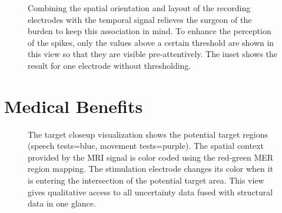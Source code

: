 \documentclass{egpubl}
\begin{document}
\begin{figure}[t]
    \centering
    \caption{Combining the spatial orientation and layout of the recording electrodes with the temporal signal relieves the surgeon of the burden to keep this association in mind. To enhance the perception of the spikes, only the values above a certain threshold are shown in this view so that they are visible pre-attentively. The inset shows the result for one electrode without thresholding.}
    \label{fig:recordingphase:3dsound}
\end{figure}


\section{Medical Benefits}\label{sec:benefits}
\begin{figure}[t]
  \centering
  \caption{The target closeup visualization shows the potential target regions (speech tests=blue, movement tests=purple). The spatial context provided by the MRI signal is color coded using the red-green MER region mapping. The stimulation electrode changes its color when it is entering the intersection of the potential target area. This view gives qualitative access to all uncertainty data fused with structural data in one glance.}
  \label{fig:targetregion}
\end{figure}
\end{document}
